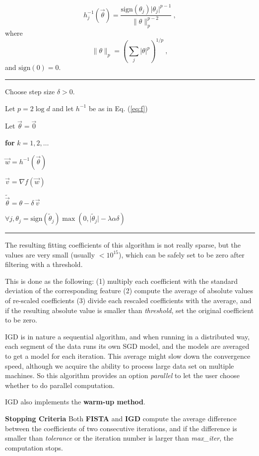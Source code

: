 \begin{equation} \label{eq:f}
h_j^{-1}(\vec{\theta}) = \frac{\mbox{sign}(\theta_j)\vert \theta_j
  \vert^{p-1}}{\|\theta\|_p^{p-2}}\ ,
\end{equation}
where
\begin{equation}
\|\theta\|_p = \left(\sum_j \vert \theta \vert ^p\right)^{1/p}\ ,
\end{equation}
and $\mbox{sign}(0) = 0$.
\vspace{0.2in}
\hrule
\vspace{0.2in}
Choose step size $\delta > 0$.

Let $p = 2\log d$ and let $h^{-1}$ be as in Eq. (\ref{eq:f})

Let $\vec{\theta} = \vec{0}$

{\bf for} $k = 1,2,\dots$

\quad $\vec{w} = h^{-1}(\vec{\theta})$

\quad $\vec{v} = \nabla f(\vec{w})$

\quad $\tilde{\vec{\theta}} = \theta - \delta \, \vec{v}$

\quad $\forall j, \theta_j = \mbox{sign}(\tilde{\theta}_j)\max (0,
\vert \tilde{\theta}_j \vert- \lambda\alpha\delta)$
\vspace{0.2in}
\hrule
\vspace{0.2in}

The resulting fitting coefficients of this algorithm is not really
sparse, but the values are very small (usually $< 10^{15}$), which can
be safely set to be zero after filtering with a threshold.

This is done as the following: (1) multiply each coefficient with the
standard deviation of the corresponding feature (2) compute the
average of absolute values of re-scaled coefficients (3) divide each
rescaled coefficients with the average, and if the resulting absolute
value is smaller than \emph{threshold}, set the original coefficient
to be zero.

IGD is in nature a sequential algorithm, and when running in a
distributed way, each segment of the data runs its own SGD model, and
the models are averaged to get a model for each iteration. This
average might slow down the convergence speed, although we acquire the
ability to process large data set on multiple machines. So this
algorithm provides an option  \emph{parallel} to let the user choose
whether to do parallel computation.

IGD also implements the {\bf warm-up method}.

{\bf Stopping Criteria} Both {\bf FISTA} and {\bf IGD} compute the average difference
between the coefficients of two consecutive iterations, and if the
difference is smaller than \emph{tolerance} or the iteration number
is larger than \emph{max\_iter}, the computation stops.

